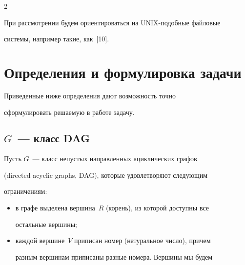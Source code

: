\begin{multicols}{2}
      


      При рассмотрении будем ориентироваться на UNIX-подобные файловые 


системы, например такие, как~[10].





\vspace*{-5pt}





\section{Определения и формулировка задачи}





\vspace*{-2pt}





      Приведенные ниже определения дают возможность точно 


сформулировать решаемую в работе задачу.





\vspace*{-5pt}





\subsection{$G$~--- класс DAG}





      Пусть $G$~--- класс непустых направленных ацик\-ли\-че\-ских графов 


(directed acyclic graphs, DAG), которые удовлетворяют следующим 


ограничениям:


      \begin{itemize}


\item в графе выделена вершина~$R$ (корень), из которой доступны все 


остальные вершины;


\item каждой вершине~$V$ приписан номер (натуральное число), причем 


разным вершинам приписаны разные номера. Вершины мы будем 



\end{itemize}
\end{multicols}
